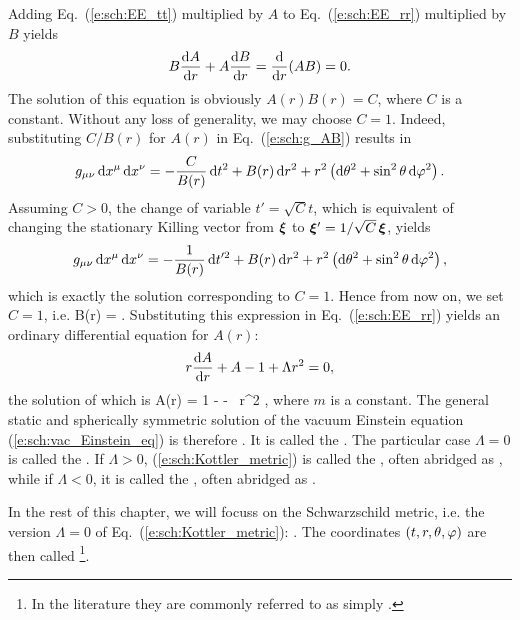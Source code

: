 Adding Eq.~(\ref{e:sch:EE_tt}) multiplied by $A$ to
Eq.~(\ref{e:sch:EE_rr}) multiplied by $B$ yields
\[
    B \frac{\mathrm{d} A}{\mathrm{d} r} + A \frac{\mathrm{d} B}{\mathrm{d} r} = \frac{\mathrm{d} }{\mathrm{d} r}(AB) = 0 .
\]
The solution of this equation is obviously $A(r)B(r) = C$, where $C$ is a constant.
Without any loss of generality, we may choose $C=1$. Indeed, substituting
$C/B(r)$ for $A(r)$ in Eq.~(\ref{e:sch:g_AB}) results in
\[
    g_{\mu\nu}\, \mathrm{d} x^\mu \, \mathrm{d} x^\nu = -\frac{C}{B(r)}\, \mathrm{d} t^2 + B(r)\, \mathrm{d} r^2 +
        r^2 \left( \mathrm{d}\theta^2 + \sin^2\theta\, \mathrm{d}\varphi^2 \right) .
\]
Assuming $C>0$, the change of variable $t' = \sqrt{C} t$, which is equivalent
of changing the stationary Killing vector from $\bm{\xi}$ to
$\bm{\xi}'=  1/\sqrt{C}\, \bm{\xi}$,
yields
\[
    g_{\mu\nu}\, \mathrm{d} x^\mu \, \mathrm{d} x^\nu = -\frac{1}{B(r)}\, \mathrm{d} t'^2 + B(r)\, \mathrm{d} r^2 +
        r^2 \left( \mathrm{d}\theta^2 + \sin^2\theta\, \mathrm{d}\varphi^2 \right) ,
\]
which is exactly the solution corresponding to $C=1$. Hence from now on,
we set $C=1$, i.e.
\be
    B(r) =  .
\ee
Substituting this expression in Eq.~(\ref{e:sch:EE_rr}) yields an ordinary
differential equation for $A(r)$:
\[
    r \frac{\mathrm{d} A}{\mathrm{d} r} + A - 1 + \Lambda r^2 = 0 ,
\]
the solution of which is
\be
    A(r) = 1 -  -  \,  r^2 ,
\ee
where $m$ is a constant.
The general static and spherically symmetric solution of the vacuum
Einstein equation (\ref{e:sch:vac_Einstein_eq}) is therefore
\be \label{e:sch:Kottler_metric}
    .
\ee
It is called the . The particular case $\Lambda=0$
is called the . If $\Lambda>0$,
(\ref{e:sch:Kottler_metric}) is called the
,
often abridged as , while if $\Lambda<0$, it
is called the ,
often abridged as .

In the rest of this chapter, we will focuss on the Schwarzschild metric,
i.e. the version $\Lambda=0$ of Eq.~(\ref{e:sch:Kottler_metric}):
\be \label{e:sch:Schwarz_metric_SD}
    .
\ee
The coordinates $(t,r,\theta,\varphi)$ are then called
\footnote{In the literature they are commonly referred to as simply
.}.


